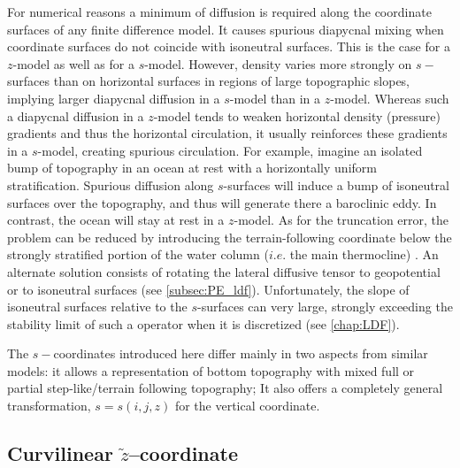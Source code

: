 \documentclass[../main/NEMO_manual]{subfiles}
\begin{document}
For numerical reasons a minimum of diffusion is required along the coordinate surfaces of any finite difference model.
It causes spurious diapycnal mixing when coordinate surfaces do not coincide with isoneutral surfaces.
This is the case for a $z$-model as well as for a $s$-model.
However, density varies more strongly on $s-$surfaces than on horizontal surfaces in regions of
large topographic slopes, implying larger diapycnal diffusion in a $s$-model than in a $z$-model.
Whereas such a diapycnal diffusion in a $z$-model tends to weaken horizontal density (pressure) gradients and thus
the horizontal circulation, it usually reinforces these gradients in a $s$-model, creating spurious circulation.
For example, imagine an isolated bump of topography in an ocean at rest with a horizontally uniform stratification.
Spurious diffusion along $s$-surfaces will induce a bump of isoneutral surfaces over the topography,
and thus will generate there a baroclinic eddy.
In contrast, the ocean will stay at rest in a $z$-model.
As for the truncation error, the problem can be reduced by introducing the terrain-following coordinate below
the strongly stratified portion of the water column ($i.e.$ the main thermocline) \citep{Madec_al_JPO96}.
An alternate solution consists of rotating the lateral diffusive tensor to geopotential or to isoneutral surfaces
(see \autoref{subsec:PE_ldf}).
Unfortunately, the slope of isoneutral surfaces relative to the $s$-surfaces can very large,
strongly exceeding the stability limit of such a operator when it is discretized (see \autoref{chap:LDF}). 

The $s-$coordinates introduced here \citep{Lott_al_OM90,Madec_al_JPO96} differ mainly in two aspects from
similar models:
it allows a representation of bottom topography with mixed full or partial step-like/terrain following topography;
It also offers a completely general transformation, $s=s(i,j,z)$ for the vertical coordinate.


\newpage

\subsection{\texorpdfstring{Curvilinear $\tilde{z}$--coordinate}{}}
\label{subsec:PE_zco_tilde}
\end{document}
